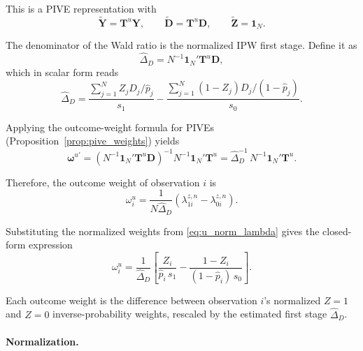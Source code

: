 \documentclass[12pt, a4paper, oneside]{article}
\theoremstyle{plain}
\theoremstyle{definition}
\begin{document}
This is a PIVE representation with
\begin{equation}
  \widetilde{\mathbf{Y}} = \mathbf{T}^u\mathbf{Y},
  \qquad
  \widetilde{\mathbf{D}} = \mathbf{T}^u\mathbf{D},
  \qquad
  \widetilde{\mathbf{Z}} = \mathbf{1}_N.
  \label{eq:u_pive_components}
\end{equation}

The denominator of the Wald ratio is the normalized IPW first stage. Define it as
\begin{equation}
  \widehat\Delta_D = N^{-1}\mathbf{1}_N'\mathbf{T}^u\mathbf{D},
  \label{eq:u_delta_matrix}
\end{equation}
which in scalar form reads
\begin{equation}
  \widehat\Delta_D
  = \frac{\sum_{j=1}^{N} Z_j D_j/\hat{p}_j}{s_1}
  - \frac{\sum_{j=1}^{N} (1-Z_j)D_j/(1-\hat{p}_j)}{s_0}.
  \label{eq:u_delta_scalar}
\end{equation}

Applying the outcome-weight formula for PIVEs (Proposition~\ref{prop:pive_weights})
yields
\begin{equation}
  \boldsymbol{\omega}^{u\prime}
  = \left(N^{-1}\mathbf{1}_N'\mathbf{T}^u\mathbf{D}\right)^{-1}
    N^{-1}\mathbf{1}_N'\mathbf{T}^u
  = \widehat\Delta_D^{-1}\,N^{-1}\mathbf{1}_N'\mathbf{T}^u.
  \label{eq:u_omega_matrix}
\end{equation}

Therefore, the outcome weight of observation $i$ is
\begin{equation}
  \omega_i^u
  = \frac{1}{N\widehat\Delta_D}
    \left(\lambda_{1i}^{z,n} - \lambda_{0i}^{z,n}\right).
  \label{eq:u_omega_lambda}
\end{equation}

Substituting the normalized weights from \eqref{eq:u_norm_lambda} gives the
closed-form expression
\begin{equation}
  \boxed{
  \omega_i^u
  = \frac{1}{\widehat\Delta_D}
    \left[
      \frac{Z_i}{\hat{p}_i\, s_1}
      - \frac{1-Z_i}{(1-\hat{p}_i)\,s_0}
    \right].
  }
  \label{eq:u_omega_scalar}
\end{equation}

Each outcome weight is the difference between observation $i$'s normalized $Z{=}1$
and $Z{=}0$ inverse-probability weights, rescaled by the estimated first stage
$\widehat\Delta_D$.

\paragraph{Normalization.}
\end{document}
